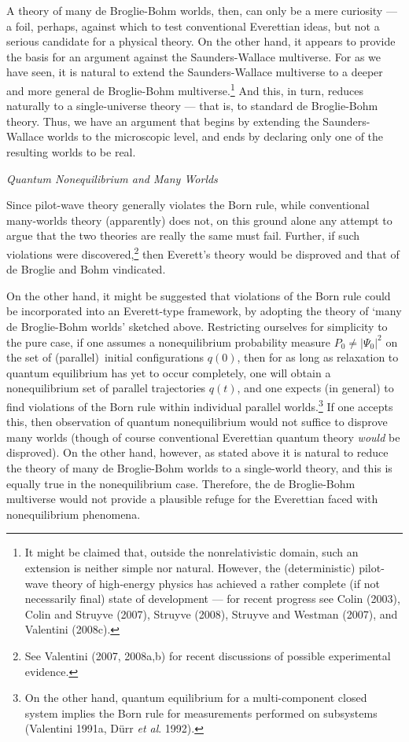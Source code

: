 \documentclass[12pt]{article}%
\begin{document}
A theory of many de Broglie-Bohm worlds, then, can only be a mere curiosity
--- a foil, perhaps, against which to test conventional Everettian ideas, but
not a serious candidate for a physical theory. On the other hand, it appears
to provide the basis for an argument against the Saunders-Wallace multiverse.
For as we have seen, it is natural to extend the Saunders-Wallace multiverse
to a deeper and more general de Broglie-Bohm multiverse.\footnote{It might be
claimed that, outside the nonrelativistic domain, such an extension is neither
simple nor natural. However, the (deterministic) pilot-wave theory of
high-energy physics has achieved a rather complete (if not necessarily final)
state of development --- for recent progress see Colin (2003), Colin and
Struyve (2007), Struyve (2008), Struyve and Westman (2007), and Valentini
(2008c).} And this, in turn, reduces naturally to a single-universe theory ---
that is, to standard de Broglie-Bohm theory. Thus, we have an argument that
begins by extending the Saunders-Wallace worlds to the microscopic level, and
ends by declaring only one of the resulting worlds to be real.

\begin{center}
\textit{Quantum Nonequilibrium and Many Worlds}
\end{center}

Since pilot-wave theory generally violates the Born rule, while conventional
many-worlds theory (apparently) does not, on this ground alone any attempt to
argue that the two theories are really the same must fail. Further, if such
violations were discovered,\footnote{See Valentini (2007, 2008a,b) for recent
discussions of possible experimental evidence.} then Everett's theory would be
disproved and that of de Broglie and Bohm vindicated.

On the other hand, it might be suggested that violations of the Born rule
could be incorporated into an Everett-type framework, by adopting the theory
of `many de Broglie-Bohm worlds' sketched above. Restricting ourselves for
simplicity to the pure case, if one assumes a nonequilibrium probability
measure $P_{0}\neq|\Psi_{0}|^{2}$ on the set of (parallel)\ initial
configurations $q(0)$, then for as long as relaxation to quantum equilibrium
has yet to occur completely, one will obtain a nonequilibrium set of parallel
trajectories $q(t)$, and one expects (in general) to find violations of the
Born rule within individual parallel worlds.\footnote{On the other hand,
quantum equilibrium for a multi-component closed system implies the Born rule
for measurements performed on subsystems (Valentini 1991a, D\"{u}rr \textit{et
al}. 1992).} If one accepts this, then observation of quantum nonequilibrium
would not suffice to disprove many worlds (though of course conventional
Everettian quantum theory \textit{would} be disproved). On the other hand,
however, as stated above it is natural to reduce the theory of many de
Broglie-Bohm worlds to a single-world theory, and this is equally true in the
nonequilibrium case. Therefore, the de Broglie-Bohm multiverse would not
provide a plausible refuge for the Everettian faced with nonequilibrium phenomena.
\end{document}
